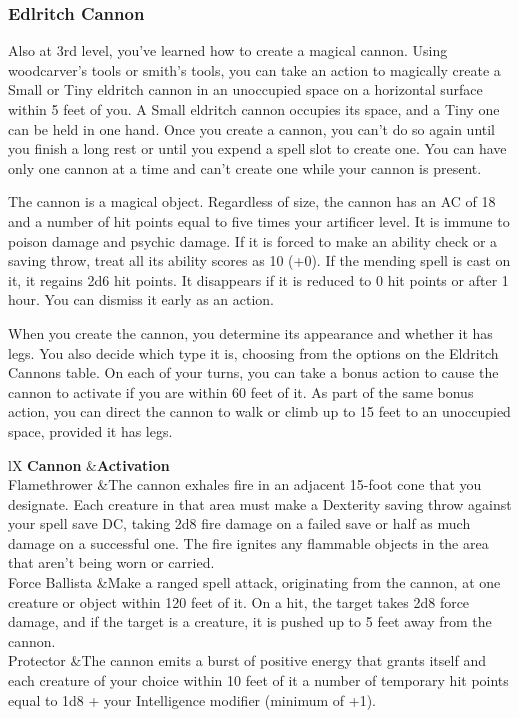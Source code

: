{\subsubsection*{Edlritch Cannon}
Also at 3rd level, you've learned how to create a magical cannon. Using woodcarver's tools or smith's tools, you can take an action to magically create a Small or Tiny eldritch cannon in an unoccupied space on a horizontal surface within 5 feet of you. A Small eldritch cannon occupies its space, and a Tiny one can be held in one hand. Once you create a cannon, you can't do so again until you finish a long rest or until you expend a spell slot to create one. You can have only one cannon at a time and can't create one while your cannon is present.

The cannon is a magical object. Regardless of size, the cannon has an AC of 18 and a number of hit points equal to five times your artificer level. It is immune to poison damage and psychic damage. If it is forced to make an ability check or a saving throw, treat all its ability scores as 10 (+0). If the mending spell is cast on it, it regains 2d6 hit points. It disappears if it is reduced to 0 hit points or after 1 hour. You can dismiss it early as an action.

When you create the cannon, you determine its appearance and whether it has legs. You also decide which type it is, choosing from the options on the Eldritch Cannons table. On each of your turns, you can take a bonus action to cause the cannon to activate if you are within 60 feet of it. As part of the same bonus action, you can direct the cannon to walk or climb up to 15 feet to an unoccupied space, provided it has legs.
\begin{DndTable}[header=Eldritch Cannon]{lX}
\textbf{Cannon}  	&\textbf{Activation}				\\
Flamethrower		&The cannon exhales fire in an adjacent 15-foot cone that you designate. Each creature in that area must make a Dexterity saving throw against your spell save DC, taking 2d8 fire damage on a failed save or half as much damage on a successful one. The fire ignites any flammable objects in the area that aren't being worn or carried.\\
Force Ballista		&Make a ranged spell attack, originating from the cannon, at one creature or object within 120 feet of it. On a hit, the target takes 2d8 force damage, and if the target is a creature, it is pushed up to 5 feet away from the cannon.\\
Protector			&The cannon emits a burst of positive energy that grants itself and each creature of your choice within 10 feet of it a number of temporary hit points equal to 1d8 + your Intelligence modifier (minimum of +1).\\
\end{DndTable}
}
